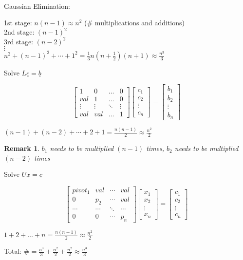 \documentclass[12pt,a4paper]{article}
\newtheorem*{rem}{Remark}
\newcommand{\Remark}[1]{
  \begin{rem}
    \color{cyan}
    #1
  \end{rem}
}
\begin{document}
Gaussian Elimination:

1st stage: $n(n-1) \approx n^2$ (\# multiplications and additions) \\
2nd stage: $(n-1)^2$ \\
3rd stage: $(n-2)^2$ \\
$\vdots$ \\
$n^2 + (n-1)^2 + \cdots + 1^2 = \frac{1}{3}n(n+\frac{1}{2})(n+1) \approx \frac{n^3}{3}$

Solve $L\underline{c} = \underline{b}$

\[
  \begin{bmatrix}
    1 & 0 & \hdots & 0 \\
    val & 1 & \hdots & 0 \\
    \vdots & \vdots & \ddots & \vdots \\
    val & val & \hdots & 1
  \end{bmatrix}
  \begin{bmatrix}
    c_1 \\
    c_2 \\
    \vdots \\
    c_n
  \end{bmatrix} =
  \begin{bmatrix}
    b_1 \\
    b_2 \\
    \vdots \\
    b_n
  \end{bmatrix}
\]

$(n-1) + (n-2) + \cdots + 2 + 1 = \frac{n(n-1)}{2} \approx \frac{n^2}{2}$


\Remark{$b_1$ needs to be multiplied $(n-1)$ times, $b_2$ needs to be multiplied $(n-2)$ times}

Solve $U\underline{x} = \underline{c}$

\[
  \begin{bmatrix}
    pivot_1 & val & \cdots & val \\
    0 & p_2 & \cdots & val \\
    \cdots & \cdots & \ddots & \cdots \\
    0 & 0 & \cdots & p_n
  \end{bmatrix}
  \begin{bmatrix}
    x_1 \\
    x_2 \\
    \vdots \\
    x_n
  \end{bmatrix} =
  \begin{bmatrix}
    c_1 \\
    c_2 \\
    \vdots \\
    c_n
  \end{bmatrix}
\]

$1 + 2 + \hdots + n = \frac{n(n-1)}{2} \approx \frac{n^2}{2}$

Total: $\# = \frac{n^3}{3} + \frac{n^2}{2} + \frac{n^2}{2} \approx \frac{n^3}{3}$
\end{document}
